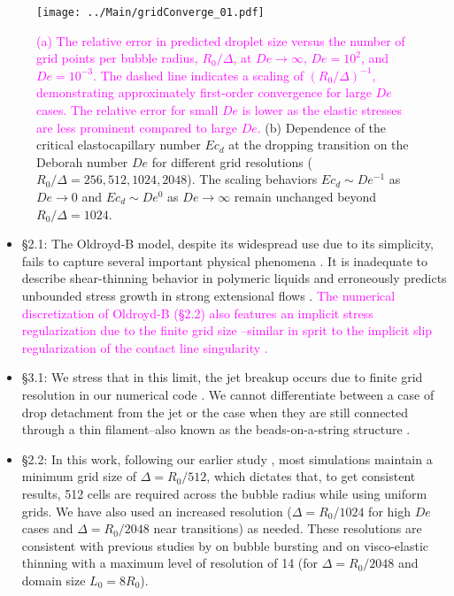 \documentclass[]{article}
\newcommand{\rev}[1]{{\textcolor{magenta}{#1}}}
\begin{document}
\begin{enumerate}
		\begin{figure}[h]
			\centering
			\texttt{[image: ../Main/gridConverge\_01.pdf]}
			\caption{ \rev{(a) The relative error in predicted droplet size versus the number of grid points per bubble radius, $R_0/\Delta$, at $De \to \infty$, $De = 10^2$, and $De = 10^{-3}$. The dashed line indicates a scaling of $(R_0/\Delta)^{-1}$, demonstrating approximately first-order convergence for large $De$ cases. The relative error for small $De$ is lower as the elastic stresses are less prominent compared to large $De$.} (b) Dependence of the critical elastocapillary number $Ec_d$ at the dropping transition on the Deborah number $De$ for different grid resolutions ($R_0/\Delta = 256, 512, 1024, 2048$). The scaling behaviors $Ec_d \sim De^{-1}$ as $De \to 0$ and $Ec_d \sim De^0$ as $De \to \infty$ remain unchanged beyond $R_0/\Delta = 1024$.}
			\label{fig:gis}
		\end{figure}
		
		\begin{itemize}
			\item 
		\S 2.1: The Oldroyd-B model, despite its widespread use due to its simplicity, fails to capture several important physical phenomena \citep{snoeijer2020relationship}. It is inadequate to describe shear-thinning behavior in polymeric liquids \citep{yamani2023master} and erroneously predicts unbounded stress growth in strong extensional flows \citep{mckinley2002filament, eggers2020self}. \rev{ The numerical discretization of Oldroyd-B (\S 2.2) also features an implicit stress regularization due to the finite grid size \citep{renardy2021mathematician}--similar in sprit to the implicit slip regularization of the contact line singularity \citep{afkhamiTransitionNumericalModel2018,fullanaConsistentTreatmentDynamic2024}.}
		
		\item 
		\S 3.1: We stress that in this limit, the jet breakup occurs due to finite grid resolution in our numerical code \citep{lohse-2020-pnas,chirco2022manifold,kant2023bag}. We cannot differentiate between a case of drop detachment from the jet or the case when they are still connected through a thin filament--also known as the beads-on-a-string structure \citep{hosokawa2023phase, clasen2006beads, pandey2021elastic, zinelis2023transition}. 
		
		\item 
		\S 2.2: In this work, following our earlier study \citep{sanjay2021bursting}, most simulations maintain a minimum grid size of $\Delta = R_0/512$, which dictates that, to get consistent results, 512 cells are required across the bubble radius while using uniform grids.
		We have also used an increased resolution ($\Delta = R_0/1024$ for high $De$ cases and $\Delta = R_0/2048$ near transitions) as needed. These resolutions are consistent with previous studies by \citet{berny2020role,berny2021statistics} on bubble bursting and \citet{turkoz2018axisymmetric,turkoz2021simulation} on visco-elastic thinning with a maximum level of resolution of 14 (for $\Delta = R_0/2048$ and domain size $L_0 = 8R_0$).
	

\end{itemize}
\end{enumerate}
\end{document}

